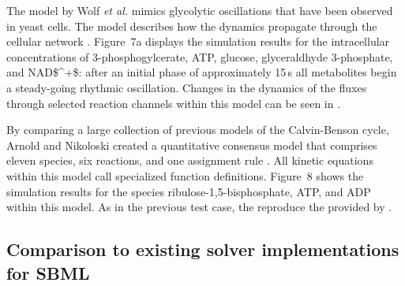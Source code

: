 \documentclass[10pt]{bmc_article}
\newenvironment{bmcformat}{\begin{raggedright}\baselineskip20pt\sloppy\setboolean{publ}{false}}{\end{raggedright}\baselineskip20pt\sloppy}
\begin{document}
\begin{bmcformat}
The model by Wolf \emph{et al.} \cite{Wolf2000} mimics glycolytic oscillations
that have been observed in yeast cells.
The model describes how the dynamics propagate through the cellular network
.
Figure~7a displays the simulation results for the intracellular concentrations
of 3-phosphogylcerate, \acs{ATP}, glucose, glyceraldhyde 3-phosphate, and 
\acs{NAD$^+$}:
after an initial phase of approximately 15\,s all metabolites begin a
steady-going rhythmic oscillation.
Changes in the dynamics of the fluxes through selected reaction channels within
this model can be seen in . 

By comparing a large collection of previous models of the Calvin-Benson
cycle, Arnold and Nikoloski created a quantitative consensus model that
comprises eleven species, six reactions, and one assignment rule
\cite{Arnold2011}.
All kinetic equations within this model call specialized function definitions.
Figure~8 shows the simulation results for the species ribulose-1,5-bisphosphate,
\acs{ATP}, and \acs{ADP} within this model.
As in the previous test case, the
reproduce the  provided by .  

\subsection*{Comparison to existing solver implementations for SBML}


\end{bmcformat}
\end{document}
